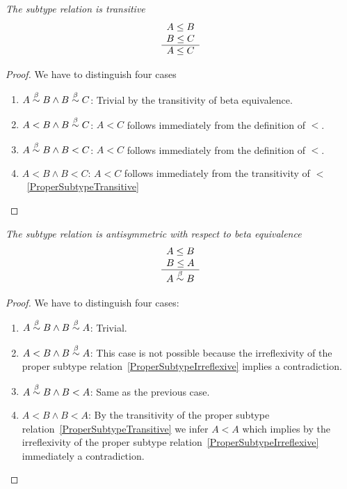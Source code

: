 \begin{theorem}
    \label{SubtypeTransitive}
    \emph{The subtype relation is transitive}
    $$
    \begin{array}{c} 
        A \le B
        \\
        B \le C
     \\ \hline 
        A \le C
    \end{array}
    $$
    \begin{proof}
        We have to distinguish four cases
        \begin{enumerate}
        \item $A \stackrel{\beta}{\sim} B \land B \stackrel{\beta}{\sim} C$: Trivial by the transitivity of
            beta equivalence.

        \item $A < B \land B \stackrel{\beta}{\sim} C$: $A < C$ follows immediately from the
            definition of $<$.

        \item $A \stackrel{\beta}{\sim} B \land B < C$: $A < C$ follows immediately from the
            definition of $<$.

        \item $A < B \land B < C$: $A < C$ follows immediately from the
            transitivity of $<$~\ref{ProperSubtypeTransitive}
        \end{enumerate}
    \end{proof}
\end{theorem}


\begin{theorem}
    \emph{The subtype relation is antisymmetric with respect to beta
    equivalence}
    $$
    \begin{array}{c} 
        A \le B
        \\
        B \le A
     \\ \hline 
        A \stackrel{\beta}{\sim} B
    \end{array}
    $$
    \begin{proof}
        We have to distinguish four cases:
        \begin{enumerate}
        \item $A \stackrel{\beta}{\sim} B \land B \stackrel{\beta}{\sim} A$: Trivial.

        \item $A < B \land B \stackrel{\beta}{\sim} A$: This case is not possible because
            the irreflexivity of the proper subtype
            relation~\ref{ProperSubtypeIrreflexive} implies a contradiction.

        \item $A \stackrel{\beta}{\sim} B \land B < A$: Same as the previous case.

        \item $A < B \land B < A$: By the transitivity of the proper subtype
            relation~\ref{ProperSubtypeTransitive} we infer $A < A$ which
            implies by the irreflexivity of the proper subtype
            relation~\ref{ProperSubtypeIrreflexive} immediately a
            contradiction.
        \end{enumerate}
    \end{proof}
\end{theorem}
